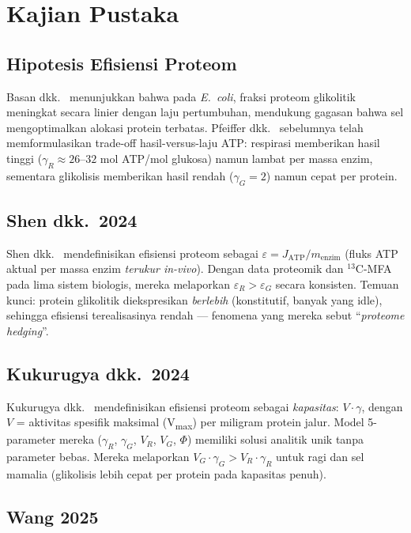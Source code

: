 \section{Kajian Pustaka}

\subsection{Hipotesis Efisiensi Proteom}

Basan dkk.\ \cite{basan2015} menunjukkan bahwa pada \textit{E.\ coli},
fraksi proteom glikolitik meningkat secara linier dengan laju pertumbuhan,
mendukung gagasan bahwa sel mengoptimalkan alokasi protein terbatas.
Pfeiffer dkk.\ \cite{pfeiffer2001} sebelumnya telah memformulasikan
trade-off hasil-versus-laju ATP: respirasi memberikan hasil tinggi
($\gamma_R \approx 26$--$32$ mol ATP/mol glukosa) namun lambat per massa
enzim, sementara glikolisis memberikan hasil rendah ($\gamma_G = 2$)
namun cepat per protein.

\subsection{Shen dkk.\ 2024}

Shen dkk.\ \cite{shen2024} mendefinisikan efisiensi proteom sebagai
$\varepsilon = J_\text{ATP} / m_\text{enzim}$ (fluks ATP aktual per massa
enzim \textit{terukur in-vivo}). Dengan data proteomik dan $^{13}$C-MFA
pada lima sistem biologis, mereka melaporkan $\varepsilon_R > \varepsilon_G$
secara konsisten. Temuan kunci: protein glikolitik diekspresikan
\textit{berlebih} (konstitutif, banyak yang idle), sehingga efisiensi
terealisasinya rendah --- fenomena yang mereka sebut ``\textit{proteome hedging}''.

\subsection{Kukurugya dkk.\ 2024}

Kukurugya dkk.\ \cite{kukurugya2024} mendefinisikan efisiensi proteom
sebagai \textit{kapasitas}: $V \cdot \gamma$, dengan $V$ = aktivitas
spesifik maksimal (V\textsubscript{max}) per miligram protein jalur.
Model 5-parameter mereka ($\gamma_R$, $\gamma_G$, $V_R$, $V_G$, $\Phi$)
memiliki solusi analitik unik tanpa parameter bebas. Mereka melaporkan
$V_G \cdot \gamma_G > V_R \cdot \gamma_R$ untuk ragi dan sel mamalia
(glikolisis lebih cepat per protein pada kapasitas penuh).

\subsection{Wang 2025}

